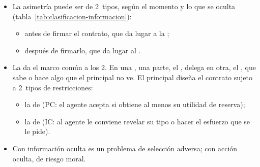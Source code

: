\documentclass[11pt]{article}
\begin{document}
\begin{itemize}
\begin{itemize}
\begin{itemize}
    \end{itemize}
  \item La asimetría puede ser de 2~tipos, según el momento y lo que se oculta (tabla~\ref{tab:clasificacion-informacion}):
    \begin{itemize}
    \item {} antes de firmar el contrato, que da lugar a la ;
    \item {} después de firmarlo, que da lugar al .
    \end{itemize}
  \item La \nocite{Ross1973Economic,JensenMeckling1976Theory} da el marco común a los 2. En una , una parte, el , delega en otra, el , que sabe o hace algo que el principal no ve. El principal diseña el contrato sujeto a 2~tipos de restricciones:
    \begin{itemize}
    \item la de  (PC: el agente acepta si obtiene al menos su utilidad de reserva);
    \item la de  (IC: al agente le conviene revelar su tipo o hacer el esfuerzo que se le pide).
    \end{itemize}
  \item Con información oculta es un problema de selección adversa; con acción oculta, de riesgo moral\nocite{LaffontMartimort2002Theory}.
  \end{itemize}
\end{itemize}
\end{document}
